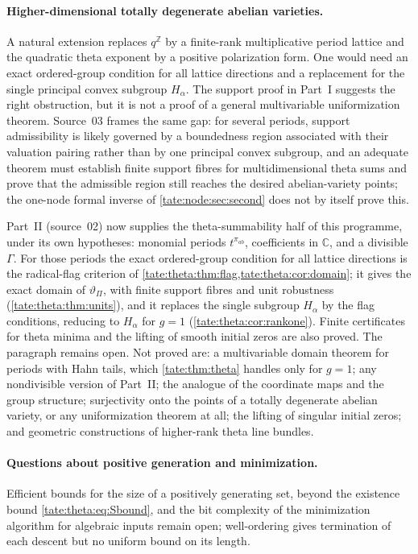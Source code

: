\documentclass[11pt,letterpaper]{article}
\theoremstyle{definition}
\newcommand{\C}{\mathbb C}
\newcommand{\Z}{\mathbb Z}
\begin{document}
\paragraph{Higher-dimensional totally degenerate abelian varieties.}
A natural extension replaces $q^\Z$ by a finite-rank multiplicative
period lattice and the quadratic theta exponent by a positive
polarization form. One would need an exact ordered-group condition for
all lattice directions and a replacement for the single principal
convex subgroup $H_\alpha$. The support proof in Part~I suggests
the right obstruction, but it is not a proof of a general multivariable
uniformization theorem. Source~03 frames the same gap: for several periods,
support admissibility is likely governed by a boundedness region associated
with their valuation pairing rather than by one principal convex subgroup,
and an adequate theorem must establish finite support fibres for
multidimensional theta sums and prove that the admissible region still
reaches the desired abelian-variety points; the one-node formal inverse of
\cref{tate:node:sec:second} does not by itself prove this.

Part~II (source~02) now supplies the theta-summability half of this
programme, under its own hypotheses: monomial periods $t^{\pi_{ab}}$,
coefficients in $\C$, and a divisible $\Gamma$. For those periods the exact
ordered-group condition for all lattice directions is the radical-flag
criterion of \cref{tate:theta:thm:flag,tate:theta:cor:domain}; it gives the
exact domain of $\vartheta_\Pi$, with finite support fibres and unit
robustness (\cref{tate:theta:thm:units}), and it replaces the single
subgroup $H_\alpha$ by the flag conditions, reducing to $H_\alpha$ for
$g=1$ (\cref{tate:theta:cor:rankone}). Finite certificates for theta minima
and the lifting of smooth initial zeros are also proved. The paragraph
remains open. Not proved are: a multivariable domain theorem for periods with
Hahn tails, which \cref{tate:thm:theta} handles only for $g=1$; any
nondivisible version of Part~II; the analogue of the coordinate maps and the
group structure; surjectivity onto the points of a totally degenerate
abelian variety, or any uniformization theorem at all; the lifting of
singular initial zeros; and geometric constructions of higher-rank theta
line bundles.

\paragraph{Questions about positive generation and minimization.}
Efficient bounds for the size of a positively generating set, beyond the
existence bound \eqref{tate:theta:eq:Sbound}, and the bit complexity of the
minimization algorithm for algebraic inputs remain open; well-ordering
gives termination of each descent but no uniform bound on its length.
\end{document}

